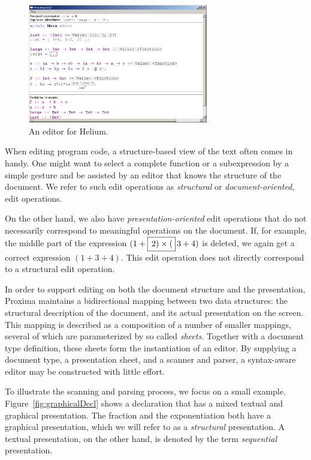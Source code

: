 \documentclass{article}[10pt]
\begin{document}
\begin{figure}[ht]
\centering
\includegraphics[width=0.7\textwidth]{images/HeliumEditor}
\caption{An editor for Helium.}
\label{fig:heliumEditor}
\end{figure}


When editing program code, a structure-based view of the text often comes in handy. One might want to select a complete  function or a subexpression by a simple gesture and be assisted by an editor that knows the structure of the document. We refer to such edit operations as {\em structural} or {\em document-oriented}, edit operations.

On the other hand, we also have {\em presentation-oriented} edit operations that do not necessarily correspond to meaningful operations on the document. If, for example, the middle part of the expression $(1+\framebox{$\,2) \times ($}\,3+4)$ is deleted, we again get a correct expression $(1+3+4)$. This edit operation does not directly correspond to a structural edit operation.


In order to support editing on both the document structure and the presentation, Proxima maintains a bidirectional mapping between two data structures: the structural description of the document, and its actual presentation on the screen. This mapping is described as a composition of a number of smaller mappings, several of which are parameterized by so called {\em sheets}. Together with a document type definition, these sheets form the instantiation of an editor. By supplying a document type, a presentation sheet, and a scanner and parser, a syntax-aware editor may be constructed with little effort.



To illustrate the scanning and parsing process, we focus on a small example. Figure~\ref{fig:graphicalDecl} shows a declaration that has a mixed textual and graphical presentation. The fraction and the exponentiation both have a graphical presentation, which we will refer to as a {\em structural} presentation. A textual presentation, on the other hand, is denoted by the term {\em sequential} presentation. 
\end{document}

